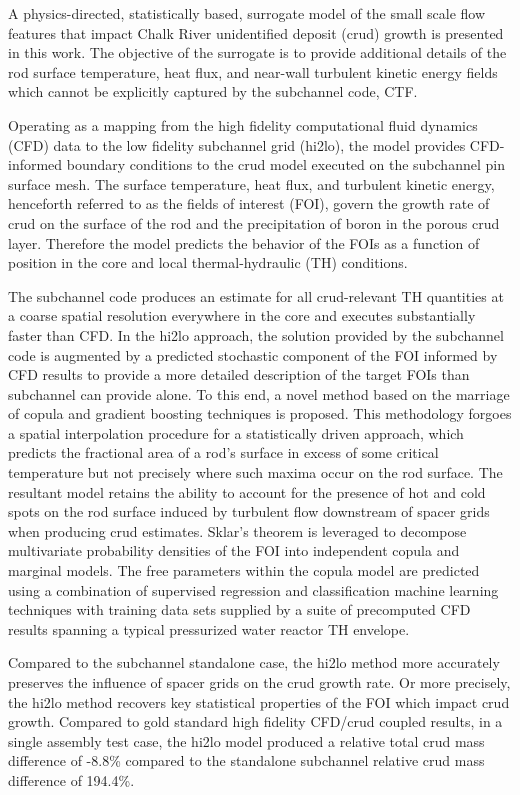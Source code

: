 
\utabstract
{}%
\indent
A physics-directed, statistically based,
surrogate model of the small scale flow features that impact Chalk River unidentified deposit (crud) growth is presented in this work. 
The objective of the surrogate is to provide additional details of the rod surface temperature, heat
flux, and near-wall turbulent kinetic energy fields which cannot be explicitly captured by the subchannel code, CTF. 

Operating as a mapping from the high fidelity computational fluid dynamics (CFD) data to the low fidelity subchannel grid (hi2lo), the model provides CFD-informed boundary conditions to the crud model executed on the subchannel pin surface mesh. The surface temperature, heat
flux, and turbulent kinetic energy, henceforth referred to as the fields of interest (FOI),
govern the growth rate of crud on the surface of the rod and the
precipitation of boron in the porous crud layer. Therefore the model predicts the behavior of the
FOIs as a function of position in the core and local thermal-hydraulic (TH) conditions.

The subchannel code produces an estimate for all crud-relevant TH quantities at a coarse spatial resolution everywhere in
the core and executes substantially faster than CFD.  In the hi2lo approach, the solution provided by the subchannel code is augmented by a predicted stochastic
component of the FOI informed by CFD results to provide a more detailed description of the target
FOIs than subchannel can provide alone.  To this end, a novel method based on the marriage of copula and
gradient boosting techniques is proposed. This methodology forgoes a spatial interpolation procedure
for a statistically driven approach, which predicts the fractional area of a rod’s surface in excess of some
critical temperature but not precisely where such maxima occur on the rod surface.
The resultant model retains the ability to account for the presence
of hot and cold spots on the rod surface induced by turbulent flow downstream of spacer grids when
producing crud estimates. Sklar’s theorem is leveraged to decompose multivariate probability densities
of the FOI into independent copula and marginal models. The free parameters within the copula model
are predicted using a combination of supervised regression and classification machine learning techniques
with training data sets supplied by a suite of precomputed CFD results spanning a typical pressurized water reactor TH
envelope.

Compared to the subchannel standalone case, the hi2lo method more accurately preserves the influence of spacer grids on the crud growth rate.  Or more precisely, the hi2lo method recovers key statistical properties of the FOI which impact crud growth.  Compared to gold standard high fidelity CFD/crud coupled results, in a single assembly test case, the hi2lo model produced a relative total crud mass difference of -8.8\% compared to the standalone subchannel relative crud mass difference of 194.4\%.
